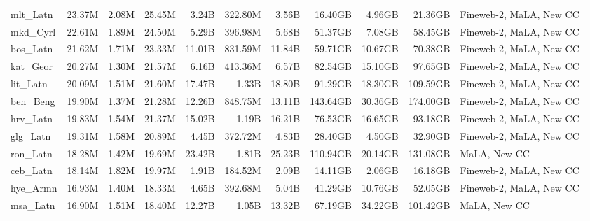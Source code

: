 \begin{table*}[!htp]
{\begin{tabular}{l|rrr|rrr|rrr|l}
mlt\_Latn                   & 23.37M     & 2.08M        & 25.45M      & 3.24B        & 322.80M        & 3.56B         & 16.40GB    & 4.96GB       & 21.36GB     & Fineweb-2, MaLA, New CC \\
mkd\_Cyrl                   & 22.61M     & 1.89M        & 24.50M      & 5.29B        & 396.98M        & 5.68B         & 51.37GB    & 7.08GB       & 58.45GB     & Fineweb-2, MaLA, New CC \\
bos\_Latn                   & 21.62M     & 1.71M        & 23.33M      & 11.01B       & 831.59M        & 11.84B        & 59.71GB    & 10.67GB      & 70.38GB     & Fineweb-2, MaLA, New CC \\
kat\_Geor                   & 20.27M     & 1.30M        & 21.57M      & 6.16B        & 413.36M        & 6.57B         & 82.54GB    & 15.10GB      & 97.65GB     & Fineweb-2, MaLA, New CC \\
lit\_Latn                   & 20.09M     & 1.51M        & 21.60M      & 17.47B       & 1.33B          & 18.80B        & 91.29GB    & 18.30GB      & 109.59GB    & Fineweb-2, MaLA, New CC \\
ben\_Beng                   & 19.90M     & 1.37M        & 21.28M      & 12.26B       & 848.75M        & 13.11B        & 143.64GB   & 30.36GB      & 174.00GB    & Fineweb-2, MaLA, New CC \\
hrv\_Latn                   & 19.83M     & 1.54M        & 21.37M      & 15.02B       & 1.19B          & 16.21B        & 76.53GB    & 16.65GB      & 93.18GB     & Fineweb-2, MaLA, New CC \\
glg\_Latn                   & 19.31M     & 1.58M        & 20.89M      & 4.45B        & 372.72M        & 4.83B         & 28.40GB    & 4.50GB       & 32.90GB     & Fineweb-2, MaLA, New CC \\
ron\_Latn                   & 18.28M     & 1.42M        & 19.69M      & 23.42B       & 1.81B          & 25.23B        & 110.94GB   & 20.14GB      & 131.08GB    & MaLA, New CC            \\
ceb\_Latn                   & 18.14M     & 1.82M        & 19.97M      & 1.91B        & 184.52M        & 2.09B         & 14.11GB    & 2.06GB       & 16.18GB     & Fineweb-2, MaLA, New CC \\
hye\_Armn                   & 16.93M     & 1.40M        & 18.33M      & 4.65B        & 392.68M        & 5.04B         & 41.29GB    & 10.76GB      & 52.05GB     & Fineweb-2, MaLA, New CC \\
msa\_Latn                   & 16.90M     & 1.51M        & 18.40M      & 12.27B       & 1.05B          & 13.32B        & 67.19GB    & 34.22GB      & 101.42GB    & MaLA, New CC            \\

\end{tabular}}
\end{table*}
